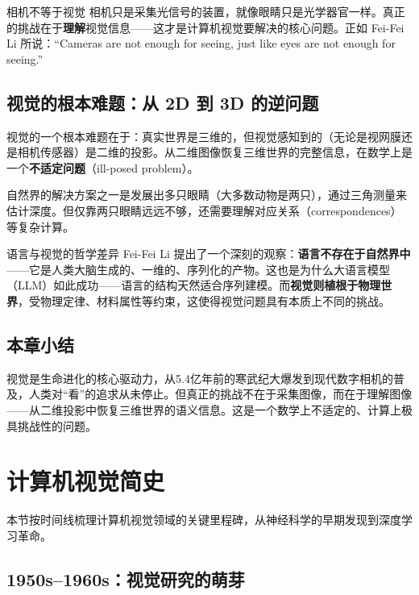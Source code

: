 \documentclass[a4paper]{article}
\begin{document}
\begin{warningbox}{相机不等于视觉}
相机只是采集光信号的装置，就像眼睛只是光学器官一样。真正的挑战在于\textbf{理解}视觉信息——这才是计算机视觉要解决的核心问题。正如 Fei-Fei Li 所说：``Cameras are not enough for seeing, just like eyes are not enough for seeing.''
\end{warningbox}

\subsection{视觉的根本难题：从 2D 到 3D 的逆问题}

视觉的一个根本难题在于：真实世界是三维的，但视觉感知到的（无论是视网膜还是相机传感器）是二维的投影。从二维图像恢复三维世界的完整信息，在数学上是一个\textbf{不适定问题}（ill-posed problem）。

自然界的解决方案之一是发展出多只眼睛（大多数动物是两只），通过三角测量来估计深度。但仅靠两只眼睛远远不够，还需要理解对应关系（correspondences）等复杂计算。

\begin{knowledgebox}{语言与视觉的哲学差异}
Fei-Fei Li 提出了一个深刻的观察：\textbf{语言不存在于自然界中}——它是人类大脑生成的、一维的、序列化的产物。这也是为什么大语言模型（LLM）如此成功——语言的结构天然适合序列建模。而\textbf{视觉则植根于物理世界}，受物理定律、材料属性等约束，这使得视觉问题具有本质上不同的挑战。
\end{knowledgebox}

\subsection{本章小结}

视觉是生命进化的核心驱动力，从5.4亿年前的寒武纪大爆发到现代数字相机的普及，人类对``看''的追求从未停止。但真正的挑战不在于采集图像，而在于理解图像——从二维投影中恢复三维世界的语义信息。这是一个数学上不适定的、计算上极具挑战性的问题。


\section{计算机视觉简史}

本节按时间线梳理计算机视觉领域的关键里程碑，从神经科学的早期发现到深度学习革命。

\subsection{1950s--1960s：视觉研究的萌芽}
\end{document}
